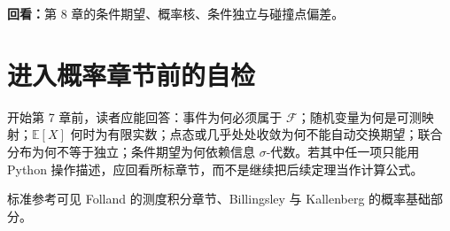 \noindent\textbf{回看：}第 8 章的条件期望、概率核、条件独立与碰撞点偏差。

\section*{进入概率章节前的自检}

开始第 7 章前，读者应能回答：事件为何必须属于 $\mathcal F$；随机变量为何是可测映射；$\mathbb E[X]$ 何时为有限实数；点态或几乎处处收敛为何不能自动交换期望；联合分布为何不等于独立；条件期望为何依赖信息 $\sigma$-代数。若其中任一项只能用 Python 操作描述，应回看所标章节，而不是继续把后续定理当作计算公式。

标准参考可见 Folland 的测度积分章节、Billingsley 与 Kallenberg 的概率基础部分\cite{folland1999analysis,billingsley1995probability,kallenberg2021foundations}。
